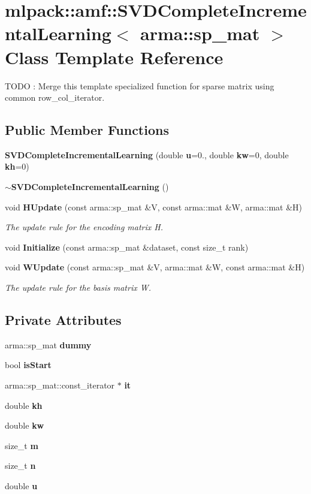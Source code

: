 \section{mlpack\+:\+:amf\+:\+:S\+V\+D\+Complete\+Incremental\+Learning$<$ arma\+:\+:sp\+\_\+mat $>$ Class Template Reference}
\label{classmlpack_1_1amf_1_1SVDCompleteIncrementalLearning_3_01arma_1_1sp__mat_01_4}


T\+O\+DO \+: Merge this template specialized function for sparse matrix using common row\+\_\+col\+\_\+iterator.  


\subsection*{Public Member Functions}
\begin{DoxyCompactItemize}
\item 
{\bf S\+V\+D\+Complete\+Incremental\+Learning} (double {\bf u}=0., double {\bf kw}=0, double {\bf kh}=0)
\item 
{\bf $\sim$\+S\+V\+D\+Complete\+Incremental\+Learning} ()
\item 
void {\bf H\+Update} (const arma\+::sp\+\_\+mat \&V, const arma\+::mat \&W, arma\+::mat \&H)
\begin{DoxyCompactList}\small\item\em The update rule for the encoding matrix H. \end{DoxyCompactList}\item 
void {\bf Initialize} (const arma\+::sp\+\_\+mat \&dataset, const size\+\_\+t rank)
\item 
void {\bf W\+Update} (const arma\+::sp\+\_\+mat \&V, arma\+::mat \&W, const arma\+::mat \&H)
\begin{DoxyCompactList}\small\item\em The update rule for the basis matrix W. \end{DoxyCompactList}\end{DoxyCompactItemize}
\subsection*{Private Attributes}
\begin{DoxyCompactItemize}
\item 
arma\+::sp\+\_\+mat {\bf dummy}
\item 
bool {\bf is\+Start}
\item 
arma\+::sp\+\_\+mat\+::const\+\_\+iterator $\ast$ {\bf it}
\item 
double {\bf kh}
\item 
double {\bf kw}
\item 
size\+\_\+t {\bf m}
\item 
size\+\_\+t {\bf n}
\item 
double {\bf u}
\end{DoxyCompactItemize}


